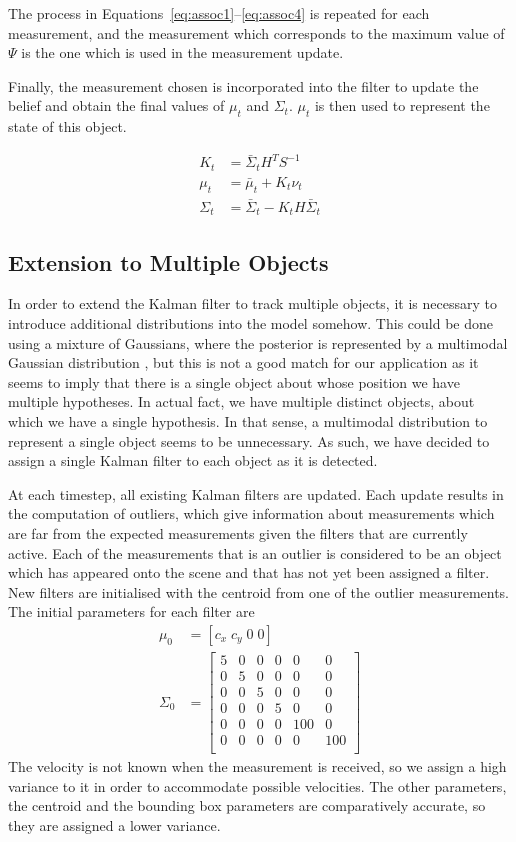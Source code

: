 \documentclass[conference]{IEEEtran}
\begin{document}
The process in Equations~\eqref{eq:assoc1}--\eqref{eq:assoc4} is repeated for
each measurement, and the measurement which corresponds to the maximum value of
$\Psi$ is the one which is used in the measurement update.

Finally, the measurement chosen is incorporated into the filter to update the
belief and obtain the final values of $\mu_t$ and $\Sigma_t$. $\mu_t$ is then
used to represent the state of this object.

\begin{align}
  K_t&=\bar{\Sigma}_tH^TS^{-1}\\
  \mu_t&=\bar{\mu}_t+K_t\nu_t\\
  \Sigma_t&=\bar{\Sigma}_t-K_tH\bar{\Sigma}_t
\end{align}
\subsection{Extension to Multiple Objects}
In order to extend the Kalman filter to track multiple objects, it is necessary
to introduce additional distributions into the model somehow. This could be done
using a mixture of Gaussians, where the posterior is represented by a
multimodal Gaussian distribution \cite{thrun2005prob}, but this is not a good
match for our application as it seems to imply that there is a single object
about whose position we have multiple hypotheses. In actual fact, we have
multiple distinct objects, about which we have a single hypothesis. In that
sense, a multimodal distribution to represent a single object seems to be
unnecessary. As such, we have decided to assign a single Kalman filter to each
object as it is detected.

At each timestep, all existing Kalman filters are updated. Each update results
in the computation of outliers, which give information about measurements which
are far from the expected measurements given the filters that are currently
active. Each of the measurements that is an outlier is considered to be an
object which has appeared onto the scene and that has not yet been assigned a
filter. New filters are initialised with the centroid from one of the outlier
measurements. The initial parameters for each filter are
\begin{align}
  \mu_0&=\left[c_x\; c_y\; 0\; 0\right]\\
  \Sigma_0&=
  \begin{bmatrix}
    5&0&0&0&0&0\\
    0&5&0&0&0&0\\
    0&0&5&0&0&0\\
    0&0&0&5&0&0\\
    0&0&0&0&100&0\\
    0&0&0&0&0&100\\
  \end{bmatrix}
\end{align}
The velocity is not known when the measurement is received, so we assign a high
variance to it in order to accommodate possible velocities. The other
parameters, the centroid and the bounding box parameters are comparatively
accurate, so they are assigned a lower variance.
\end{document}
